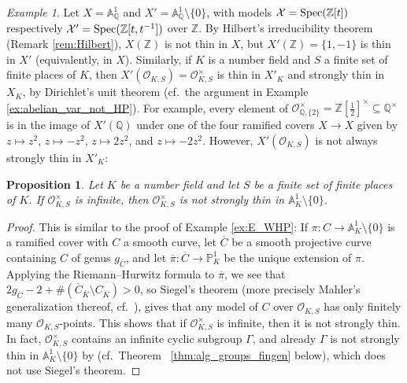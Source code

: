 \documentclass[10pt,a4paper]{amsart}
\theoremstyle{plain}
\newtheorem{proposition}[theorem]{Proposition}
\theoremstyle{remark}
\newtheorem{example}[theorem]{Example}
\numberwithin{theorem}{section}
\begin{document}
\begin{example}
Let $X=\mathbb{A}^1_\mathbb{Q}$ and $X'=\mathbb{A}^1_\mathbb{Q}\setminus\{0\}$,
with models
$\mathcal{X}={\rm Spec}(\mathbb{Z}[t])$ respectively
$\mathcal{X}'={\rm Spec}(\mathbb{Z}[t,t^{-1}])$ over $\mathbb{Z}$.
By Hilbert's irreducibility theorem (Remark \ref{rem:Hilbert}),  $X(\mathbb{Z})$ is not thin in $X$,
but
 $X'(\mathbb{Z})=\{1,-1\}$ is thin in $X'$ (equivalently, in $X$).
Similarly,
if $K$ is a number field and $S$ a finite set of finite places of $K$, then $X'(\mathcal{O}_{K,S})=\mathcal{O}_{K,S}^\times$ is thin in $X'_K$ and strongly thin in $X_K$,
by Dirichlet's unit theorem (cf.~the argument in Example \ref{ex:abelian_var_not_HP}).
For example,
every element of
 $\mathcal{O}_{\mathbb{Q},\{2\}}^\times=\mathbb{Z}[\frac{1}{2}]^\times\subseteq\mathbb{Q}^\times$
is in the image of $X'(\mathbb{Q})$ under one of 
the four ramified covers $X\to X$ given by $z\mapsto z^2$, $z\mapsto -z^2$, $z\mapsto 2z^2$, and $z\mapsto -2z^2$.
However, $X'(\mathcal{O}_{K,S})$ is not always strongly thin in $X'_K$:  
\end{example}

\begin{proposition}\label{thm:G_m}
    Let $K$ be a number field and let $S$ be a finite set of finite places of $K$. If  $\mathcal{O}_{K,S}^\times$ is infinite, then   $\mathcal{O}_{K,S}^\times$ is not strongly thin in  $\mathbb{A}^1_{K}\setminus \{0\}$. 
\end{proposition}
\begin{proof}
    This is similar to the proof of Example \ref{ex:E_WHP}:
    If $\pi\colon C\to \mathbb{A}^1_K\setminus \{0\}$ is a  ramified cover with $C$ a smooth curve,
    let $\overline{C}$ be a smooth projective curve containing $C$ of genus $g_{\overline{C}}$, and let $\overline{\pi}\colon \overline{C}\to \mathbb{P}^1_K$ be the unique extension of $\pi$. 
    Applying the Riemann--Hurwitz formula to $\overline{\pi}$, we see that $2g_{\overline{C}} -2 + \#(\overline{C}_{\overline{K}}\setminus C_{\overline{K}}) >0$,
 so Siegel's theorem (more precisely Mahler's generalization thereof, cf.~\cite[Theorem 1]{CZ02}), gives that  any model of $C$ over $\mathcal{O}_{K,S}$ has only finitely many $\mathcal{O}_{K,S}$-points. 
 This shows that 
 if $\mathcal{O}_{K,S}^\times$ is infinite, then it  is not strongly thin. 
 In fact, $\mathcal{O}_{K,S}^{\times}$ contains an infinite cyclic subgroup $\Gamma$, 
 and already $\Gamma$ is not strongly thin in $\mathbb{A}^1_K\setminus\{0\}$
 by
 \cite[Theorem~4]{Zannier}
 (cf.\ Theorem~  \ref{thm:alg_groups_fingen} below),
 which does not use Siegel's theorem. 
\end{proof}
\end{document}
